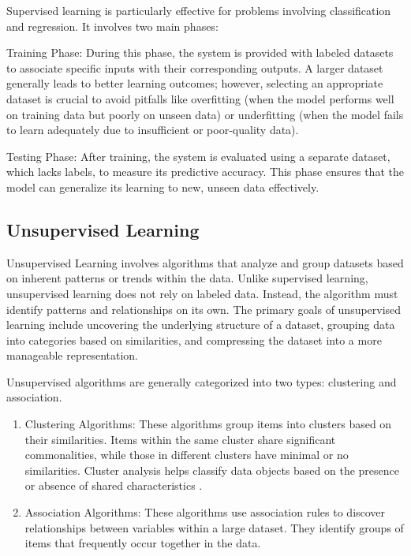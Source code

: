 Supervised learning is particularly effective for problems involving classification and regression. It involves two main phases:

Training Phase: During this phase, the system is provided with labeled datasets to associate specific inputs with their corresponding outputs. A larger dataset generally leads to better learning outcomes; however, selecting an appropriate dataset is crucial to avoid pitfalls like overfitting (when the model performs well on training data but poorly on unseen data) or underfitting (when the model fails to learn adequately due to insufficient or poor-quality data).

Testing Phase: After training, the system is evaluated using a separate dataset, which lacks labels, to measure its predictive accuracy. This phase ensures that the model can generalize its learning to new, unseen data effectively.

\subsection{Unsupervised Learning}
Unsupervised Learning involves algorithms that analyze and group datasets based on inherent patterns or trends within the data. Unlike supervised learning, unsupervised learning does not rely on labeled data. Instead, the algorithm must identify patterns and relationships on its own. The primary goals of unsupervised learning include uncovering the underlying structure of a dataset, grouping data into categories based on similarities, and compressing the dataset into a more manageable representation.

Unsupervised algorithms are generally categorized into two types: clustering and association.
\begin{enumerate}
	\item Clustering Algorithms: These algorithms group items into clusters based on their similarities. Items within the same cluster share significant commonalities, while those in different clusters have minimal or no similarities. Cluster analysis helps classify data objects based on the presence or absence of shared characteristics \cite{GFG:2024}.
	\item Association Algorithms: These algorithms use association rules to discover relationships between variables within a large dataset. They identify groups of items that frequently occur together in the data.
\end{enumerate}

